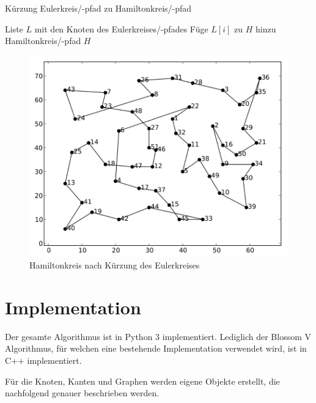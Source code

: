 \documentclass[11pt,a4paper]{article}
\begin{document}
\begin{algorithm}[H]
    \renewcommand{\algorithmicrequire}{\textbf{Eingabe:}}
    \renewcommand{\algorithmicensure}{\textbf{Ausgabe:}}
    \caption{Kürzung Eulerkreis/-pfad zu Hamiltonkreis/-pfad}

    \begin{algorithmic}[1]
    \REQUIRE Liste $L$ mit den Knoten des Eulerkreises/-pfades 
            \STATE Füge $L[i]$ zu $H$ hinzu
        \ENDIF
    \ENDFOR
    \ENSURE Hamiltonkreis/-pfad $H$
    \end{algorithmic}
\end{algorithm}

\begin{figure}[H]
        \centering
        \includegraphics[width=13cm]{gfx/eil51_tour}
        \caption{Hamiltonkreis nach Kürzung des Eulerkreises}
        \label{img:eil51_tour}
\end{figure}

\newpage
\section{Implementation}
Der gesamte Algorithmus ist in Python 3 implementiert. Lediglich der Blossom V Algorithmus, für welchen eine bestehende Implementation verwendet wird, ist in C++ implementiert.

Für die Knoten, Kanten und Graphen werden eigene Objekte erstellt, die nachfolgend genauer beschrieben werden. 

\end{document}
